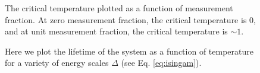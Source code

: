 \documentclass[twocolumn,superscriptaddress,aps,prb,floatfix]{revtex4-1}
\begin{document}
\begin{figure}
\begin{center}
\end{center}
\caption{The critical temperature plotted as a function of measurement fraction.  At zero measurement fraction, the critical temperature is 0, and at unit measurement fraction, the critical temperature is $\sim 1$.}
\label{fig:CriticalTempVsMeasurementFraction}
\end{figure}

\begin{figure}
\begin{center}
\end{center}
\caption{Here we plot the lifetime of the system as a function of temperature for a variety of energy scales $\Delta$ (see Eq. \ref{eq:isingam}).}
\label{fig:LifetimeVsTemperatureVsEnergy}
\end{figure}
\end{document}
